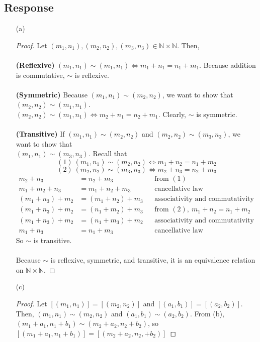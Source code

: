 \documentclass[13pt]{article}
\begin{document}
\subsection*{Response}
\begin{enumerate}
\item [(a)]
  \begin{proof}
    Let $(m_1, n_1), (m_2, n_2), (m_3, n_3) \in \mathbb{N} \times \mathbb{N}$. Then, \\ \\
    \textbf{(Reflexive)} $(m_1, n_1) \sim (m_1, n_1) \iff m_1 + n_1 = n_1 + m_1$. Because addition is
    commutative, $\sim$ is reflexive. \\ \\
    \textbf{(Symmetric)} Because $(m_1, n_1) \sim (m_2, n_2)$, we want to show that $(m_2, n_2) \sim (m_1, n_1)$.
    \\ $(m_2, n_2) \sim (m_1, n_1) \iff m_2 + n_1 = n_2 + m_1$. Clearly, $\sim$ is symmetric. \\ \\
    \textbf{(Transitive)} If $(m_1, n_1) \sim (m_2, n_2)$ and $(m_2, n_2) \sim (m_3, n_3)$, we want to show that
    \\ $(m_1, n_1) \sim (m_3, n_3)$. Recall that
    \[(1)\ (m_1, n_1) \sim (m_2, n_2) \iff m_1 + n_2 = n_1 + m_2\]
    \[(2)\ (m_2, n_2) \sim (m_3, n_3) \iff m_2 + n_3 = n_2 + m_3\]
    \begin{align*}
      m_2 + n_3 &= n_2 + m_3 && \text{from }(1) \\
      m_1 + m_2 + n_3 &= m_1 + n_2 + m_3 && \text{cancellative law} \\
      (m_1 + n_3) + m_2 &= (m_1 + n_2) + m_3 && \text{associativity and commutativity of addition} \\
      (m_1 + n_3) + m_2 &= (n_1 + m_2) + m_3 && \text{from } (2), \ m_1 + n_2 = n_1 + m_2 \\
      (m_1 + n_3) + m_2 &= (n_1 + m_3) + m_2 && \text{associativity and commutativity of addition} \\
      m_1 + n_3 &= n_1 + m_3 && \text{cancellative law}
    \end{align*}
    So $\sim$ is transitive. \\ \\
    Because $\sim$ is reflexive, symmetric, and transitive, it is an equivalence relation on $\mathbb{N} \times
    \mathbb{N}$.
  \end{proof}
\item [(c)]
  \begin{proof}
    Let $[(m_1, n_1)] = [(m_2, n_2)]$ and $[(a_1, b_1)] = [(a_2, b_2)]$. Then, $(m_1, n_1) \sim (m_2, n_2)$ and
    $(a_1, b_1) \sim (a_2, b_2)$. From (b), $(m_1 + a_1, n_1 + b_1) \sim (m_2 + a_2, n_2 + b_2)$, so
    $[(m_1 + a_1, n_1 + b_1)] = [(m_2 + a_2, n_2, + b_2)]$
  \end{proof}


\end{enumerate}
\end{document}
